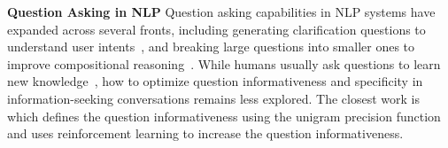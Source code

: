 \noindent
\textbf{Question Asking in NLP}\quad
Question asking capabilities in NLP systems have expanded across several fronts, including generating clarification questions to understand user intents~\citep{aliannejadi2019asking, rahmani-etal-2023-survey}, and breaking large questions into smaller ones to improve compositional reasoning~\citep{press-etal-2023-measuring}. While humans usually ask questions to learn new knowledge~\citep{tawfik2020role,booth2003craft}, how to optimize question informativeness and specificity in information-seeking conversations remains less explored. The closest work is~\citet{qi-etal-2020-stay} which defines the question informativeness using the unigram precision function and uses reinforcement learning to increase the question informativeness.



